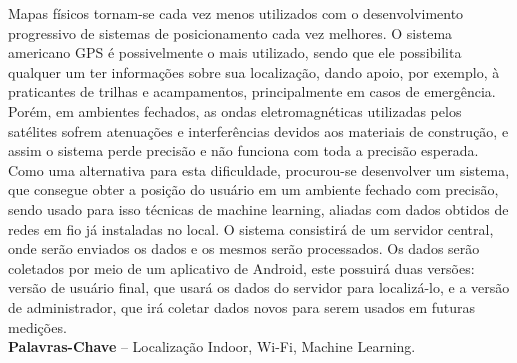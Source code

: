 \begin{resumo}

Mapas físicos tornam-se cada vez menos utilizados com o desenvolvimento progressivo
de sistemas de posicionamento cada vez melhores. O sistema americano
GPS é possivelmente o mais utilizado, sendo que ele possibilita qualquer um ter informações
sobre sua localização, dando apoio, por exemplo, à praticantes de trilhas e
acampamentos, principalmente em casos de emergência. Porém, em ambientes fechados,
as ondas eletromagnéticas utilizadas pelos satélites sofrem atenuações e interferências
devidos aos materiais de construção, e assim o sistema perde precisão e não
funciona com toda a precisão esperada. Como uma alternativa para esta dificuldade,
procurou-se desenvolver um sistema, que consegue obter a posição do usuário em um
ambiente fechado com precisão, sendo usado para isso técnicas de machine learning,
aliadas com dados obtidos de redes em fio já instaladas no local. O sistema consistirá
de um servidor central, onde serão enviados os dados e os mesmos serão processados.
Os dados serão coletados por meio de um aplicativo de Android, este possuirá
duas versões: versão de usuário final, que usará os dados do servidor para localizá-lo, e a
versão de administrador, que irá coletar dados novos para serem usados em futuras medições.
%
\\[3\baselineskip]
%
\textbf{Palavras-Chave} -- Localização Indoor, Wi-Fi, Machine Learning.
\end{resumo}